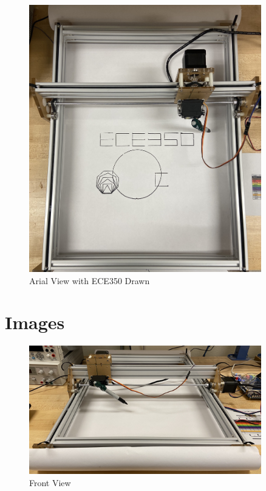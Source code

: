 \documentclass[12pt]{article}
\begin{document}
\begin{figure}[ht!]
\begin{center}
\includegraphics[width=0.9\textwidth]{IMG_0475.jpg}
\end{center}
\caption{Arial View with ECE350 Drawn}
\end{figure}

\section{Images}
\begin{figure}[ht!]
\begin{center}
\includegraphics[width=0.9\textwidth]{IMG_0468.jpg}
\end{center}
\caption{Front View}
\end{figure}
\end{document}
